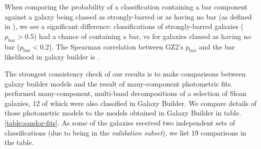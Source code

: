 \documentclass[../main.tex]{subfiles}
\begin{document}
When comparing the probability of a classification containing a bar component against a galaxy being classed as strongly-barred or as having no bar (as defined in \citealt{Masters2010:1003.0449v2}), we see a significant difference: classifications of strongly-barred galaxies ($p_\text{bar} > 0.5$) had a  chance of containing a bar, vs  for galaxies classed as having no bar ($p_\text{bar} < 0.2$). The Spearman correlation between GZ2's $p_\text{bar}$ and the bar likelihood in galaxy builder is .

The strongest consistency check of our results is to make comparisons between galaxy builder models and the result of many-component photometric fits. \citet{Kruk2017:1710.00093v2} performed many-component, multi-band decompositions of a selection of Sloan galaxies, 12 of which were also classified in Galaxy Builder. We compare details of those photometric models to the models obtained in Galaxy Builder in table.\ref{table:sandor-fits}. As some of the galaxies received two independent sets of classifications (due to being in the \textit{validation subset}), we list 19 comparisons in the table.

\end{document}
